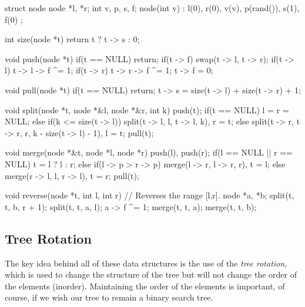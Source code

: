 \begin{mylstlisting}[language=C++]
struct node {
  node *l, *r;
  int v, p, s, f;
  node(int v) : l(0), r(0), v(v), p(rand()), s(1), f(0) {}
};

int size(node *t){
  return t ? t -> s : 0;
}

void push(node *t){
  if(t == NULL) return;
  if(t -> f){
    swap(t -> l, t -> r);
    if(t -> l) t -> l -> f ^= 1;
    if(t -> r) t -> r -> f ^= 1;
    t -> f = 0;
  }
}

void pull(node *t){
  if(t == NULL) return;
  t -> s = size(t -> l) + size(t -> r) + 1;
}

void split(node *t, node *&l, node *&r, int k){
  push(t);
  if(t == NULL) l = r = NULL;
  else if(k <= size(t -> l)) split(t -> l, l, t -> l, k), r = t;
  else split(t -> r, t -> r, r, k - size(t -> l) - 1), l = t;
  pull(t);
}

void merge(node *&t, node *l, node *r){
  push(l), push(r);
  if(l == NULL || r == NULL) t = l ? l : r;
  else if(l -> p > r -> p) merge(l -> r, l -> r, r), t = l;
  else merge(r -> l, l, r -> l), t = r;
  pull(t);
}

void reverse(node *t, int l, int r){
  // Reverses the range [l,r].
  node *a, *b;
  split(t, t, b, r + 1);
  split(t, t, a, l);
  a -> f ^= 1;
  merge(t, t, a);
  merge(t, t, b);
}
\end{mylstlisting}

\subsection{Tree Rotation}

The key idea behind all of these data structures is the use of the \textit{tree rotation}, which is used to change the structure of the tree but will not change the order of the elements (inorder). Maintaining the order of the elements is important, of course, if we wish our tree to remain a binary search tree.

